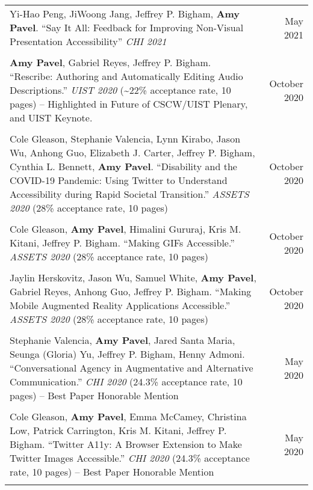 \begin{longtable}{Xr}
	Yi-Hao Peng, JiWoong Jang, Jeffrey P. Bigham, \textbf{Amy Pavel}. ``Say It All: Feedback for Improving Non-Visual Presentation Accessibility'' \textit{CHI 2021} & May 2021 \\
	\\

	\textbf{Amy Pavel}, Gabriel Reyes, Jeffrey P. Bigham. ``Rescribe: Authoring and Automatically Editing Audio Descriptions.'' \textit{UIST 2020} (\textasciitilde22\% acceptance rate, 10 pages) -- Highlighted in Future of CSCW/UIST Plenary, and UIST Keynote. & October 2020 \\
	\\

	Cole Gleason, Stephanie Valencia, Lynn Kirabo, Jason Wu, Anhong Guo, Elizabeth J. Carter, Jeffrey P. Bigham, Cynthia L. Bennett, \textbf{Amy Pavel}. ``Disability and the COVID-19 Pandemic: Using Twitter to Understand Accessibility during Rapid Societal Transition.'' \textit{ASSETS 2020} (28\% acceptance rate, 10 pages) & October 2020 \\
	\\

	Cole Gleason, \textbf{Amy Pavel}, Himalini Gururaj, Kris M. Kitani, Jeffrey P. Bigham. ``Making GIFs Accessible.'' \textit{ASSETS 2020} (28\% acceptance rate, 10 pages) & October 2020 \\
	\\

	Jaylin Herskovitz, Jason Wu, Samuel White, \textbf{Amy Pavel}, Gabriel Reyes, Anhong Guo, Jeffrey P. Bigham. ``Making Mobile Augmented Reality Applications Accessible.'' \textit{ASSETS 2020} (28\% acceptance rate, 10 pages) & October 2020 \\
	\\

	Stephanie Valencia, \textbf{Amy Pavel}, Jared Santa Maria, Seunga (Gloria) Yu, Jeffrey P. Bigham, Henny Admoni. ``Conversational Agency in Augmentative and Alternative Communication.'' \textit{CHI 2020} (24.3\% acceptance rate, 10 pages) -- Best Paper Honorable Mention & May 2020 \\
	\\

	Cole Gleason, \textbf{Amy Pavel}, Emma McCamey, Christina Low, Patrick Carrington, Kris M. Kitani, Jeffrey P. Bigham. ``Twitter A11y: A Browser Extension to Make Twitter Images Accessible.'' \textit{CHI 2020} (24.3\% acceptance rate, 10 pages) -- Best Paper Honorable Mention & May 2020 \\
	\\


\end{longtable}

